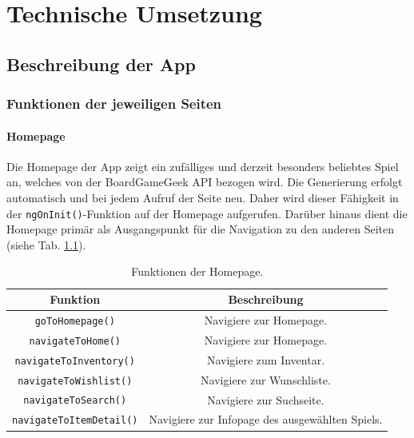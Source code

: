 \chapter{Technische Umsetzung}
\section{Beschreibung der App}
\subsection{Funktionen der jeweiligen Seiten}
\subsubsection{Homepage}
Die Homepage der App zeigt ein zufälliges und derzeit besonders beliebtes Spiel an, welches von der BoardGameGeek \ac{API} bezogen wird.
Die Generierung erfolgt automatisch und bei jedem Aufruf der Seite neu. Daher wird dieser Fähigkeit in der \texttt{ngOnInit()}-Funktion auf der Homepage aufgerufen.
Darüber hinaus dient die Homepage primär als Ausgangspunkt für die Navigation zu den anderen Seiten (siehe Tab. \ref{tab:homepage}).
\begin{table}[H]
    \centering
    \begin{tabular}{|c|c|}
        \hline
        \textbf{Funktion} & \textbf{Beschreibung} \\
        \hline
        \texttt{goToHomepage()} & Navigiere zur Homepage. \\
        \texttt{navigateToHome()} & Navigiere zur Homepage. \\
        \texttt{navigateToInventory()} & Navigiere zum Inventar. \\
        \texttt{navigateToWishlist()} & Navigiere zur Wunschliste. \\
        \texttt{navigateToSearch()} & Navigiere zur Suchseite. \\
        \texttt{navigateToItemDetail()} & Navigiere zur Infopage des ausgewählten Spiels. \\
        \hline
    \end{tabular}
    \caption{Funktionen der Homepage.}
    \label{tab:homepage}
\end{table}
